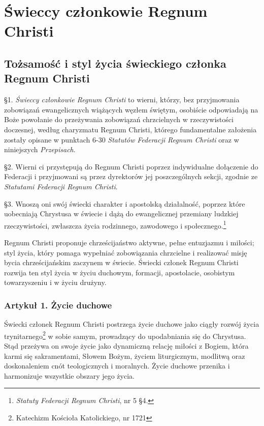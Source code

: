 \part{Świeccy członkowie Regnum Christi}

\chapter{Tożsamość i styl życia świeckiego członka Regnum Christi}


 \S{}1. {\em Świeccy członkowie Regnum Christi} to wierni, którzy, bez przyjmowania zobowiązań ewangelicznych wiążących węzłem świętym, osobiście odpowiadają na Boże powołanie do przeżywania zobowiązań chrzcielnych w rzeczywistości doczesnej, według charyzmatu Regnum Christi, którego fundamentalne założenia zostały opisane w punktach 6-30 {\em Statutów Federacji Regnum Christi} oraz w niniejszych {\em Przepisach}.

\S{}2. Wierni ci przystępują do Regnum Christi poprzez indywidualne dołączenie do Federacji i przyjmowani są przez dyrektorów jej poszczególnych sekcji, zgodnie ze {\em Statutami Federacji Regnum Christi}.

\S{}3. Wnoszą oni swój świecki charakter i apostolską działalność, poprzez które uobecniają Chrystusa w świecie i dążą do ewangelicznej przemiany ludzkiej rzeczywistości, zwłaszcza życia rodzinnego, zawodowego i społecznego.\footnote{{\em Statuty Federacji Regnum Christi}, nr 5 \S{}4.}


\label{numerdwa}Regnum Christi proponuje chrześcijaństwo aktywne, pełne entuzjazmu i miłości; styl życia, który pomaga wypełniać zobowiązania chrzcielne i realizować misję bycia chrześcijańskim zaczynem w świecie. Świecki członek Regnum Christi rozwija ten styl życia w życiu duchowym, formacji, apostolacie, osobistym towarzyszeniu i w życiu drużyny.


\section{Artykuł 1. Życie duchowe}


 Świecki członek Regnum Christi postrzega życie duchowe jako ciągły rozwój życia trynitarnego\footnote{Katechizm Kościoła Katolickiego, nr 1721} w sobie samym, prowadzący do upodabniania się do Chrystusa. Stąd przeżywa on swoje życie jako dynamiczną relację miłości z Bogiem, która karmi się sakramentami, Słowem Bożym, życiem liturgicznym, modlitwą oraz doskonaleniem cnót teologicznych i moralnych. Życie duchowe przenika i harmonizuje wszystkie obszary jego życia.

